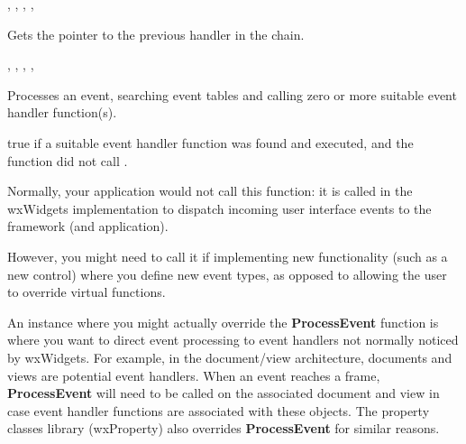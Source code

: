 
,\rtfsp
{},\rtfsp
{},\rtfsp
{},\rtfsp
{}

\label{wxevthandlergetprevioushandler}


Gets the pointer to the previous handler in the chain.


,\rtfsp
{},\rtfsp
{},\rtfsp
{},\rtfsp
{}

\label{wxevthandlerprocessevent}


Processes an event, searching event tables and calling zero or more suitable event handler function(s).




true if a suitable event handler function was found and executed, and the function did not
call .


Normally, your application would not call this function: it is called in the wxWidgets
implementation to dispatch incoming user interface events to the framework (and application).

However, you might need to call it if implementing new functionality (such as a new control) where
you define new event types, as opposed to allowing the user to override virtual functions.

An instance where you might actually override the {\bf ProcessEvent} function is where you want
to direct event processing to event handlers not normally noticed by wxWidgets. For example,
in the document/view architecture, documents and views are potential event handlers.
When an event reaches a frame, {\bf ProcessEvent} will need to be called on the associated
document and view in case event handler functions are associated with these objects.
The property classes library (wxProperty) also overrides {\bf ProcessEvent} for similar reasons.

